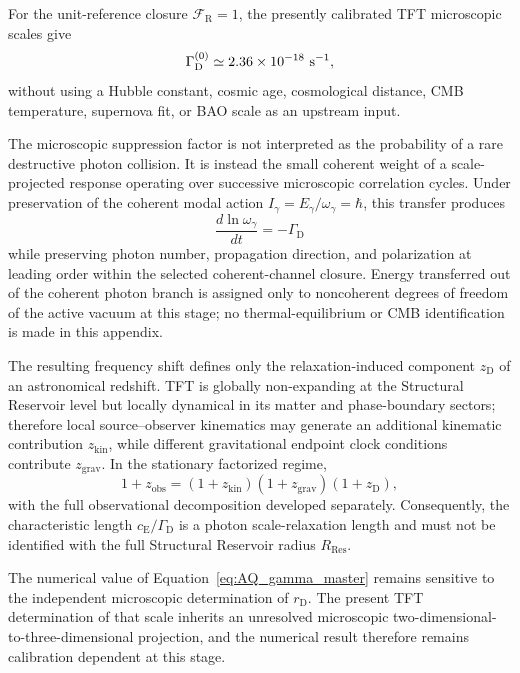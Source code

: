 For the unit-reference closure
$\mathcal F_{\mathrm R}=1$, the presently calibrated TFT microscopic scales
give
\begin{equation}
    \Gamma_{\mathrm D}^{(0)}
    \simeq
    2.36\times10^{-18}\ {\rm s^{-1}},
\end{equation}
without using a Hubble constant, cosmic age, cosmological distance, CMB
temperature, supernova fit, or BAO scale as an upstream input.

The microscopic suppression factor is not interpreted as the probability of a
rare destructive photon collision. It is instead the small coherent weight of
a scale-projected response operating over successive microscopic correlation
cycles. Under preservation of the coherent modal action
$I_{\gamma}=E_{\gamma}/\omega_{\gamma}=\hbar$, this transfer produces
\begin{equation}
    \frac{d\ln\omega_{\gamma}}{dt}
    =
    -\Gamma_{\mathrm D}
\end{equation}
while preserving photon number, propagation direction, and polarization at
leading order within the selected coherent-channel closure. Energy transferred
out of the coherent photon branch is assigned only to noncoherent degrees of
freedom of the active vacuum at this stage; no thermal-equilibrium or CMB
identification is made in this appendix.

The resulting frequency shift defines only the relaxation-induced component
$z_{\mathrm D}$ of an astronomical redshift. TFT is globally non-expanding at
the Structural Reservoir level but locally dynamical in its matter and
phase-boundary sectors; therefore local source--observer kinematics may
generate an additional kinematic contribution $z_{\mathrm{kin}}$, while
different gravitational endpoint clock conditions contribute
$z_{\mathrm{grav}}$. In the stationary factorized regime,
\begin{equation}
    1+z_{\mathrm{obs}}
    =
    (1+z_{\mathrm{kin}})
    (1+z_{\mathrm{grav}})
    (1+z_{\mathrm D}),
\end{equation}
with the full observational decomposition developed separately. Consequently,
the characteristic length
$c_{\mathrm E}/\Gamma_{\mathrm D}$ is a photon scale-relaxation length and
must not be identified with the full Structural Reservoir radius
$R_{\mathrm{Res}}$.

The numerical value of Equation~\eqref{eq:AQ_gamma_master} remains sensitive
to the independent microscopic determination of $r_{\mathrm D}$. The present
TFT determination of that scale inherits an unresolved microscopic
two-dimensional-to-three-dimensional projection, and the numerical result
therefore remains calibration dependent at this stage.


